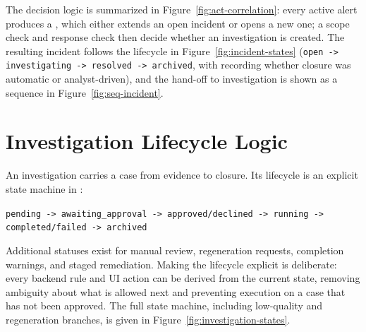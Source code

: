 
The decision logic is summarized in Figure~\ref{fig:act-correlation}: every active alert produces a , which either extends an open incident or opens a new one; a scope check and response check then decide whether an investigation is created. The resulting incident follows the lifecycle in Figure~\ref{fig:incident-states} (\texttt{open -> investigating -> resolved -> archived}, with  recording whether closure was automatic or analyst-driven), and the hand-off to investigation is shown as a sequence in Figure~\ref{fig:seq-incident}.




\section{Investigation Lifecycle Logic}

An investigation carries a case from evidence to closure. Its lifecycle is an explicit state machine in :

\begin{center}
\texttt{pending -> awaiting\_approval -> approved/declined -> running -> completed/failed -> archived}
\end{center}

Additional statuses exist for manual review, regeneration requests, completion warnings, and staged remediation. Making the lifecycle explicit is deliberate: every backend rule and UI action can be derived from the current state, removing ambiguity about what is allowed next and preventing execution on a case that has not been approved. The full state machine, including low-quality and regeneration branches, is given in Figure~\ref{fig:investigation-states}.


